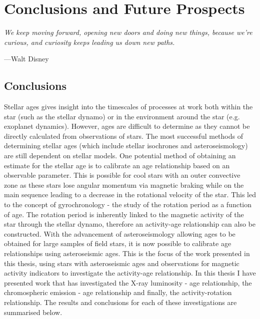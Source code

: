 
\chapter{Conclusions and Future Prospects} %

\label{Chapter6} %


\epigraph{\itshape We keep moving forward, opening new doors and doing new things, because we're curious, and curiosity keeps leading us down new paths.}{---Walt Disney}

\section{Conclusions}

Stellar ages gives insight into the timescales of processes at work both within the star (such as the stellar dynamo) or in the environment around the star (e.g. exoplanet dynamics). However, ages are difficult to determine as they cannot be directly calculated from observations of stars. The most successful methods of determining stellar ages (which include stellar isochrones and asteroseismology) are still dependent on stellar models. One potential method of obtaining an estimate for the stellar age is to calibrate an age relationship based on an observable parameter. This is possible for cool stars with an outer convective zone as these stars lose angular momentum via magnetic braking while on the main sequence leading to a decrease in the rotational velocity of the star. This led to the concept of gyrochronology - the study of the rotation period as a function of age. The rotation period is inherently linked to the magnetic activity of the star through the stellar dynamo, therefore an activity-age relationship can also be constructed. With the advancement of asteroseismology allowing ages to be obtained for large samples of field stars, it is now possible to calibrate age relationships using asteroseismic ages. This is the focus of the work presented in this thesis, using stars with asteroseismic ages and observations for magnetic activity indicators to investigate the activity-age relationship. In this thesis I have presented work that has investigated the X-ray luminosity - age relationship, the chromospheric emission - age relationship and finally, the activity-rotation relationship. The results and conclusions for each of these investigations are summarised below.

